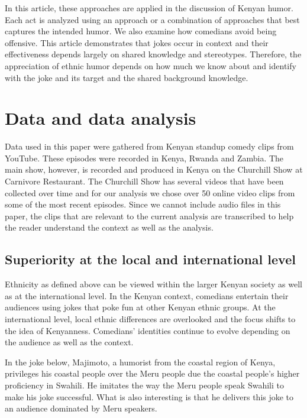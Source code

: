 \documentclass[output=paper]{langsci/langscibook}
\begin{document}
In this article, these approaches are applied in the discussion of Kenyan humor. Each act is analyzed using an approach or a combination of approaches that best captures the intended humor. We also examine how comedians avoid being offensive. This article demonstrates that jokes occur in context and their effectiveness depends largely on shared knowledge and stereotypes. Therefore, the appreciation of ethnic humor depends on how much we know about and identify with the joke and its target and the shared background knowledge. 

\section{Data and data analysis}

Data used in this paper were gathered from Kenyan standup comedy clips from YouTube. These episodes were recorded in Kenya, Rwanda and Zambia. The main show, however, is recorded and produced in Kenya on the Churchill Show at Carnivore Restaurant. The Churchill Show has several videos that have been collected over time and for our analysis we chose over 50 online video clips from some of the most recent episodes. Since we cannot include audio files in this paper, the clips that are relevant to the current analysis are transcribed to help the reader understand the context as well as the analysis. 

\subsection{Superiority at the local and international level}

Ethnicity as defined above can be viewed within the larger Kenyan society as well as at the international level. In the Kenyan context, comedians entertain their audiences using jokes that poke fun at other Kenyan ethnic groups. At the international level, local ethnic differences are overlooked and the focus shifts to the idea of Kenyanness. Comedians’ identities continue to evolve depending on the audience as well as the context.

In the joke below, Majimoto, a humorist from the coastal region of Kenya, privileges his coastal people over the Meru people due the coastal people’s higher proficiency in Swahili. He imitates the way the Meru people speak Swahili to make his joke successful. What is also interesting is that he delivers this joke to an audience dominated by Meru speakers.
 
\end{document}
